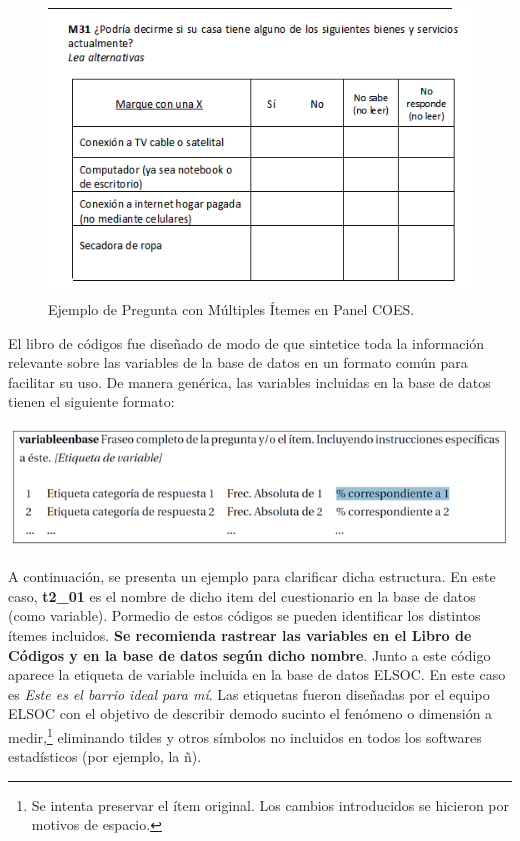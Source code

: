 \documentclass[
]{book}
\begin{document}
\begin{figure}

{\centering \includegraphics[width=0.75\linewidth,height=0.75\textheight]{imagenes/Figura_item} 

}

\caption{Ejemplo de Pregunta con Múltiples Ítemes en Panel COES.}\label{fig:unnamed-chunk-12}
\end{figure}

El libro de códigos fue diseñado de modo de que sintetice toda la información relevante sobre las variables de la base de datos en un formato común para facilitar su uso. De manera genérica, las variables incluidas en la base de datos tienen el siguiente formato:

\begin{center}\includegraphics[width=0.9\linewidth,height=0.9\textheight]{imagenes/inst_var} \end{center}

A continuación, se presenta un ejemplo para clarificar dicha estructura. En este caso, \textbf{t2\_01} es el nombre de dicho item del cuestionario en la base de datos (como variable). Pormedio de estos códigos se pueden identificar los distintos ítemes incluidos. \textbf{Se recomienda rastrear las variables en el Libro de Códigos y en la base de datos según dicho nombre}. Junto a este código aparece la etiqueta de variable incluida en la base de datos ELSOC. En este caso es \emph{Este es el barrio ideal para mí}. Las etiquetas fueron diseñadas por el equipo ELSOC con el objetivo de describir demodo sucinto el fenómeno o dimensión a medir,\footnote{Se intenta preservar el ítem original. Los cambios introducidos se hicieron por motivos de espacio.} eliminando tildes y otros símbolos no incluidos en todos los softwares estadísticos (por ejemplo, la ñ).
\end{document}
